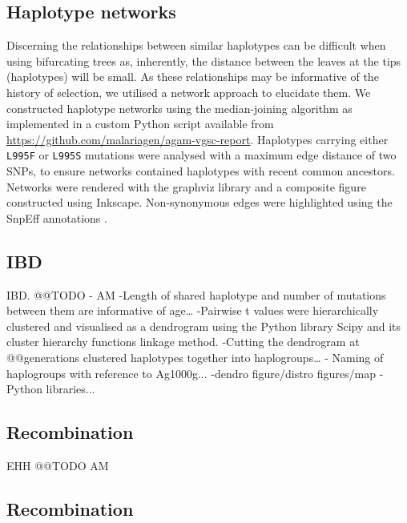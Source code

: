 \documentclass[a4paper,11pt,abstracton,hidelinks]{scrartcl}
\begin{document}
\subsection*{Haplotype networks}

%
Discerning the relationships between similar haplotypes can be difficult when using bifurcating trees as, inherently, the distance between the leaves at the tips (haplotypes) will be small.
%
As these relationships may be informative of the history of selection, we utilised a network approach to elucidate them.
%
We constructed haplotype networks using the median-joining algorithm \cite{Bandelt1999} as implemented in a custom Python script available from \url{https://github.com/malariagen/agam-vgsc-report}.
%
Haplotypes carrying either \texttt{L995F} or \texttt{L995S} mutations were analysed with a maximum edge distance of two SNPs, to ensure networks contained haplotypes with recent common ancestors.
%
Networks were rendered with the graphviz library and a composite figure constructed using Inkscape.
%
Non-synonymous edges were highlighted using the SnpEff annotations \cite{Cingolani2012}.


\subsection*{IBD}

%
IBD. @@TODO - AM
-Length of shared haplotype and number of mutations between them are informative of age…
-Pairwise t values were hierarchically clustered and visualised as a dendrogram using the Python library Scipy and its cluster hierarchy functions linkage method.
-Cutting the dendrogram at @@generations clustered haplotypes together into haplogroups…
- Naming of haplogroups with reference to Ag1000g...
-dendro figure/distro figures/map - Python libraries...


\subsection*{Recombination}

%
EHH @@TODO AM


\subsection*{Recombination}
\end{document}
